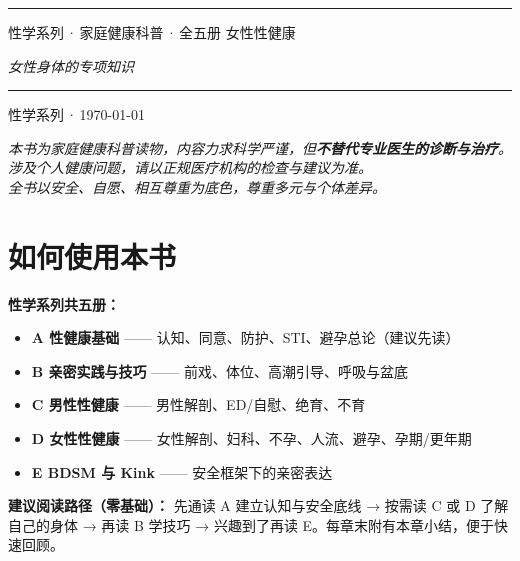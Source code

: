 \documentclass[12pt,UTF8,openany]{ctexbook}
\begin{document}
\begin{titlepage}
\centering
\vspace*{1.5cm}
\vspace{0.6cm}
\noindent\rule{\textwidth}{0.4pt}
\vspace{0.5cm}
\myhei{} 性学系列\,·\,家庭健康科普\,·\,全五册
\vspace{2.5cm}
\myhei{} 女性性健康\par
\vspace{1.2cm}
\itshape{} 女性身体的专项知识\par
\vspace{5.2cm}
\noindent\rule{\textwidth}{0.4pt}
\vspace{0.5cm}
 性学系列\,·\,\today
\end{titlepage}

\begin{center}\itshape
本书为家庭健康科普读物，内容力求科学严谨，但\textbf{不替代专业医生的诊断与治疗}。\\
涉及个人健康问题，请以正规医疗机构的检查与建议为准。\\
全书以安全、自愿、相互尊重为底色，尊重多元与个体差异。\par\end{center}
\clearpage

\chapter*{如何使用本书}
\noindent\textbf{性学系列共五册：}
\begin{itemize}[leftmargin=2em]
\item \textbf{A 性健康基础} —— 认知、同意、防护、STI、避孕总论（建议先读）
\item \textbf{B 亲密实践与技巧} —— 前戏、体位、高潮引导、呼吸与盆底
\item \textbf{C 男性性健康} —— 男性解剖、ED/自慰、绝育、不育
\item \textbf{D 女性性健康} —— 女性解剖、妇科、不孕、人流、避孕、孕期/更年期
\item \textbf{E BDSM 与 Kink} —— 安全框架下的亲密表达
\end{itemize}
\vspace{0.6em}
\noindent\textbf{建议阅读路径（零基础）：} 先通读 A 建立认知与安全底线 → 按需读 C 或 D 了解自己的身体 → 再读 B 学技巧 → 兴趣到了再读 E。每章末附有本章小结，便于快速回顾。
\clearpage
\end{document}
